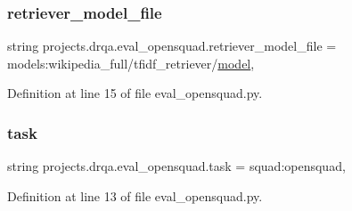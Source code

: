 \subsubsection{\texorpdfstring{retriever\+\_\+model\+\_\+file}{retriever\_model\_file}}
{\footnotesize\ttfamily string projects.\+drqa.\+eval\+\_\+opensquad.\+retriever\+\_\+model\+\_\+file = \textquotesingle{}models\+:wikipedia\+\_\+full/tfidf\+\_\+retriever/\hyperlink{namespaceprojects_1_1drqa_1_1eval__opensquad_a60b0684a4caa747d9ca449286553850c}{model}\textquotesingle{},}



Definition at line 15 of file eval\+\_\+opensquad.\+py.

\mbox{\label{namespaceprojects_1_1drqa_1_1eval__opensquad_a183a58d88e2105a247123fd565b32c33}} 
\subsubsection{\texorpdfstring{task}{task}}
{\footnotesize\ttfamily string projects.\+drqa.\+eval\+\_\+opensquad.\+task = \textquotesingle{}squad\+:opensquad\textquotesingle{},}



Definition at line 13 of file eval\+\_\+opensquad.\+py.

